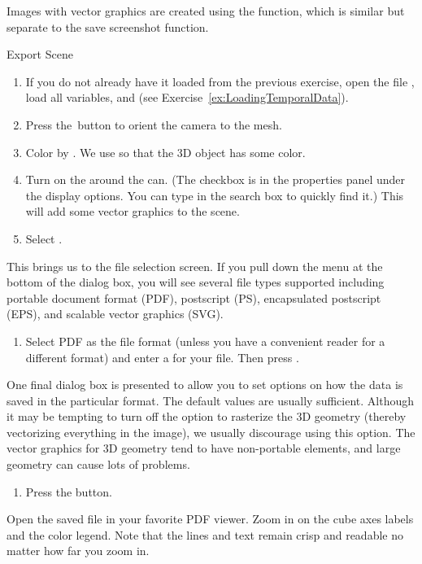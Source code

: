 Images with vector graphics are created using the 
function, which is similar but separate to the save screenshot function.

\begin{exercise}{Export Scene}
  \label{ex:ExportScene}
  \begin{enumerate}
  \item If you do not already have it loaded from the previous exercise,
    open the file , load all variables, and \apply (see
    Exercise~\ref{ex:LoadingTemporalData}).
  \item Press the~\yPlus button to orient the camera to the mesh.
  \item Color by .  We use  so that the
    3D object has some color.
  \item Turn on the  around the can. (The checkbox is in the
    properties panel under the display options. You can type  in
    the search box to quickly find it.) This will add some vector graphics
    to the scene.
  \item Select  \ra {}.
    \savecounter
  \end{enumerate}

  This brings us to the file selection screen. If you pull down the menu
   at the bottom of the dialog box, you will see
  several file types supported including
  portable document format
  (PDF), postscript (PS),
  encapsulated postscript (EPS),
  and scalable vector graphics
  (SVG).

  \begin{enumerate}
    \restorecounter
  \item Select PDF as the file format (unless you have a convenient reader
    for a different format) and enter a  for your file. Then
    press .
    \savecounter
  \end{enumerate}

  One final dialog box is presented to allow you to set options on how the
  data is saved in the particular format. The default values are usually
  sufficient. Although it may be tempting to turn off the option to
  rasterize the 3D geometry (thereby vectorizing everything in the image),
  we usually discourage using this option. The vector graphics for 3D
  geometry tend to have non-portable elements, and large geometry can cause
  lots of problems.

  \begin{enumerate}
    \restorecounter
  \item Press the  button.
  \end{enumerate}

  Open the saved file in your favorite PDF viewer. Zoom in on the cube axes
  labels and the color legend. Note that the lines and text remain crisp
  and readable no matter how far you zoom in.
\end{exercise}

